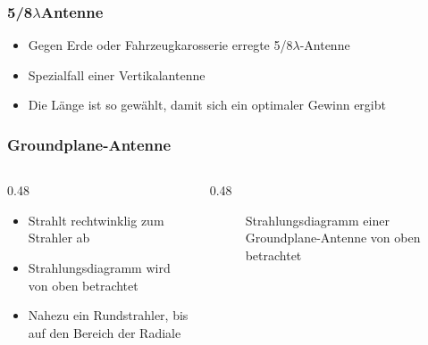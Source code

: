 \begin{frame}
    \frametitle{5/8$\lambda$Antenne}
    \begin{itemize}
        \item Gegen Erde oder Fahrzeugkarosserie erregte 5/8$\lambda$-Antenne
        \item Spezialfall einer Vertikalantenne
        \item Die Länge ist so gewählt, damit sich ein optimaler Gewinn ergibt
    \end{itemize}
\end{frame}

\begin{frame}
\end{frame}

\begin{frame}
    \frametitle{Groundplane-Antenne}
    \begin{columns}
        \begin{column}{0.48\textwidth}
            \begin{itemize}
                \item Strahlt rechtwinklig zum Strahler ab
                \item Strahlungsdiagramm wird von oben betrachtet
                \item Nahezu ein Rundstrahler, bis auf den Bereich der Radiale
            \end{itemize}

        \end{column}
        \begin{column}{0.48\textwidth}

            \begin{figure}
                \caption{\scriptsize Strahlungsdiagramm einer Groundplane-Antenne von oben betrachtet}
                \label{e_antennenformen_strahlungsdiagramm_groundplane}
            \end{figure}


        \end{column}
    \end{columns}

\end{frame}

